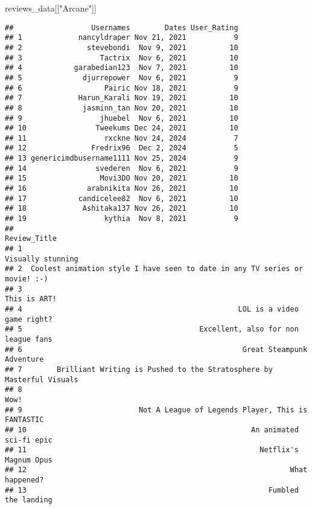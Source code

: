\documentclass[
]{article}
\newenvironment{Shaded}{\begin{snugshade}}{\end{snugshade}}
\newcommand{\NormalTok}[1]{#1}
\newcommand{\StringTok}[1]{\textcolor[rgb]{0.31,0.60,0.02}{#1}}
\begin{document}
\begin{Shaded}
\begin{Highlighting}[]
\NormalTok{reviews\_data[[}\StringTok{"Arcane"}\NormalTok{]]}
\end{Highlighting}
\end{Shaded}

\begin{verbatim}
##                  Usernames        Dates User_Rating
## 1             nancyldraper Nov 21, 2021           9
## 2               stevebondi  Nov 9, 2021          10
## 3                  Tactrix  Nov 6, 2021          10
## 4            garabedian123  Nov 7, 2021          10
## 5              djurrepower  Nov 6, 2021           9
## 6                   Pairic Nov 18, 2021           9
## 7             Harun_Karali Nov 19, 2021          10
## 8              jasminn_tan Nov 20, 2021          10
## 9                  jhuebel  Nov 6, 2021          10
## 10                Tweekums Dec 24, 2021          10
## 11                  rxckne Nov 24, 2024           7
## 12               Fredrix96  Dec 2, 2024           5
## 13 genericimdbusername1111 Nov 25, 2024           9
## 14                svederen  Nov 6, 2021           9
## 15                 Movi3DO Nov 20, 2021          10
## 16              arabnikita Nov 26, 2021          10
## 17            candicelee82  Nov 6, 2021          10
## 18             Ashitaka137 Nov 26, 2021          10
## 19                  kythia  Nov 8, 2021           9
##                                                                  Review_Title
## 1                                                           Visually stunning
## 2  Coolest animation style I have seen to date in any TV series or movie! :-)
## 3                                                                This is ART!
## 4                                                  LOL is a video game right?
## 5                                         Excellent, also for non league fans
## 6                                                   Great Steampunk Adventure
## 7        Brilliant Writing is Pushed to the Stratosphere by Masterful Visuals
## 8                                                                        Wow!
## 9                           Not A League of Legends Player, This is FANTASTIC
## 10                                                    An animated sci-fi epic
## 11                                                      Netflix's Magnum Opus
## 12                                                             What happened?
## 13                                                        Fumbled the landing

\end{verbatim}
\end{document}
